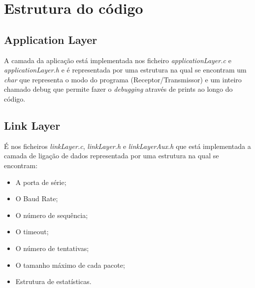 \documentclass[11pt]{article}
\begin{document}
\newpage
\section{Estrutura do código}

\subsection{Application Layer}
 
  A camada da aplicação está implementada nos ficheiro \textit{applicationLayer.c} e \textit{applicationLayer.h} e é representada por uma estrutura na qual se encontram um \textit{char} que representa o modo do programa (Receptor/Transmissor) e um inteiro chamado debug que permite fazer o \textit{debugging} através de prints ao longo do código.
 
\small
{}

\normalsize

\subsection{Link Layer}
 
 É nos ficheiros \textit{linkLayer.c}, \textit{linkLayer.h} e \textit{linkLayerAux.h} que está implementada a camada de ligação de dados representada por uma estrutura na qual se encontram:

\begin{itemize}
  \item A porta de série;
   \item O Baud Rate;
   \item O número de sequência;
   \item O timeout;
   \item O número de tentativas;
   \item O tamanho máximo de cada pacote;
   \item Estrutura de estatísticas.
\end{itemize}

\small
{}

\normalsize
\end{document}
